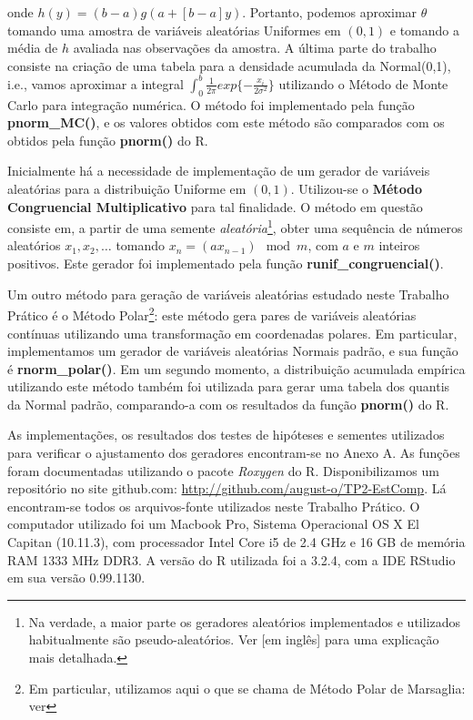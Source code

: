 \documentclass[
	article,			%
	12pt,				%
	twoside,			%
	a4paper,			%
	english,			%
	brazil,				%
	]{abntex2}
\begin{document}
    onde $h(y) = (b-a)g(a+[b-a]y)$. Portanto, podemos aproximar $\theta$ tomando uma amostra de variáveis aleatórias Uniformes em $(0,1)$ e tomando a média de $h$ avaliada nas observações da amostra. A última parte do trabalho consiste na criação de uma tabela para a densidade acumulada da Normal(0,1), i.e., vamos aproximar a integral $\int_0^b \frac{1}{2\pi}exp\{-\frac{x_i}{2\sigma^2}\}$ utilizando o Método de Monte Carlo para integração numérica. O método foi implementado pela função \textbf{pnorm\_MC()}, e os valores obtidos com este método são comparados com os obtidos pela função \textbf{pnorm()} do R.
    
    Inicialmente há a necessidade de implementação de um gerador de variáveis aleatórias para a distribuição Uniforme em $(0,1)$. Utilizou-se o \textbf{Método Congruencial Multiplicativo} para tal finalidade. O método em questão consiste em, a partir de uma semente \textit{aleatória}\footnote{Na verdade, a maior parte os geradores aleatórios implementados e utilizados habitualmente são pseudo-aleatórios. Ver \cite{wiki:001} [em inglês] para uma explicação mais detalhada.}, obter uma sequência de números aleatórios ${x_1,x_2,\dots}$ tomando $x_n = (ax_{n-1}) \mod m$, com $a$ e $m$ inteiros positivos. Este gerador foi implementado pela função \textbf{runif\_congruencial()}. 
    
    Um outro método para geração de variáveis aleatórias estudado neste Trabalho Prático é o Método Polar\footnote{Em particular, utilizamos aqui o que se chama de Método Polar de Marsaglia: ver }: este método gera pares de variáveis aleatórias contínuas utilizando uma transformação em coordenadas polares. Em particular, implementamos um gerador de variáveis aleatórias Normais padrão, e sua função é \textbf{rnorm\_polar()}. Em um segundo momento, a distribuição acumulada empírica utilizando este método também foi utilizada para gerar uma tabela dos quantis da Normal padrão, comparando-a com os resultados da função \textbf{pnorm()} do R.
    
    As implementações, os resultados dos testes de hipóteses e sementes utilizados para verificar o ajustamento dos geradores encontram-se no Anexo A. As funções foram documentadas utilizando o pacote \textit{Roxygen} do R. Disponibilizamos um repositório no site github.com: \url{http://github.com/august-o/TP2-EstComp}. Lá encontram-se todos os arquivos-fonte utilizados neste Trabalho Prático. O computador utilizado foi um Macbook Pro, Sistema Operacional OS X El Capitan (10.11.3), com processador Intel Core i5 de 2.4 GHz e 16 GB de memória RAM 1333 MHz DDR3. A versão do R utilizada foi a 3.2.4, com a IDE RStudio em sua versão 0.99.1130.  
    
\end{document}
